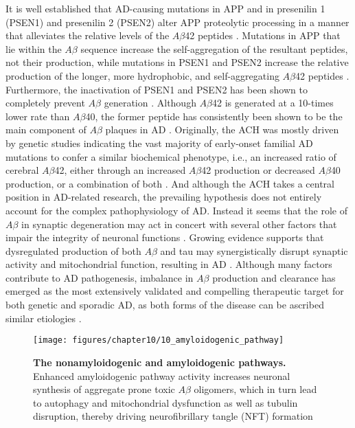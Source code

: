 It is well established that AD-causing mutations in APP and in presenilin 1 (PSEN1) and presenilin 2 (PSEN2) alter APP proteolytic processing in a manner that alleviates the relative levels of the $A\beta$42 peptides \citep{Borchelt1996,Scheuner1996}. Mutations in APP that lie within the $A\beta$ sequence increase the self-aggregation of the resultant peptides, not their production, while mutations in PSEN1 and PSEN2 increase the relative production of the longer, more hydrophobic, and self-aggregating $A\beta$42 peptides \citep{Kim2008,Weggen2012}. Furthermore, the inactivation of PSEN1 and PSEN2 has been shown to completely prevent $A\beta$ generation \citep{Herreman2000,Zhang2000}. Although $A\beta$42 is generated at a 10-times lower rate than $A\beta$40, the former peptide has consistently been shown to be the main component of $A\beta$ plaques in AD \citep{Iwatsubo1994}. Originally, the ACH was mostly driven by genetic studies indicating the vast majority of early-onset familial AD mutations to confer a similar biochemical phenotype, i.e., an increased ratio of cerebral $A\beta$42, either through an increased $A\beta$42 production or decreased $A\beta$40 production, or a combination of both \citep{Cavallucci2012,Cruts1998}. And although the ACH takes a central position in AD-related research, the prevailing hypothesis does not entirely account for the complex pathophysiology of AD. Instead it seems that the role of $A\beta$ in synaptic degeneration may act in concert with several other factors that impair the integrity of neuronal functions \citep{anand2014,DalPra2015}. Growing evidence supports that dysregulated production of both $A\beta$ and tau may synergistically disrupt synaptic activity and mitochondrial function, resulting in AD \citep{Chetelat2013,Musiek2015,Quintanilla2012,Teplow2013}. Although many factors contribute to AD pathogenesis, imbalance in $A\beta$ production and clearance has emerged as the most extensively validated and compelling therapeutic target for both genetic and sporadic AD, as both forms of the disease can be ascribed similar etiologies \citep{Selkoe2012,Selkoe2016}.

\begin{figure}[!htbp]
  \center
  \texttt{[image: figures/chapter10/10\_amyloidogenic\_pathway]}
  \caption[The nonamyloidogenic and amyloidogenic pathways.]{\textbf{The nonamyloidogenic and amyloidogenic pathways.} Enhanced amyloidogenic pathway activity increases neuronal synthesis of aggregate prone toxic $A\beta$ oligomers, which in turn lead to autophagy and mitochondrial dysfunction as well as tubulin disruption, thereby driving neurofibrillary tangle (NFT) formation}
  \label{fig:10_amyloidogenic_pathway}
\end{figure}

